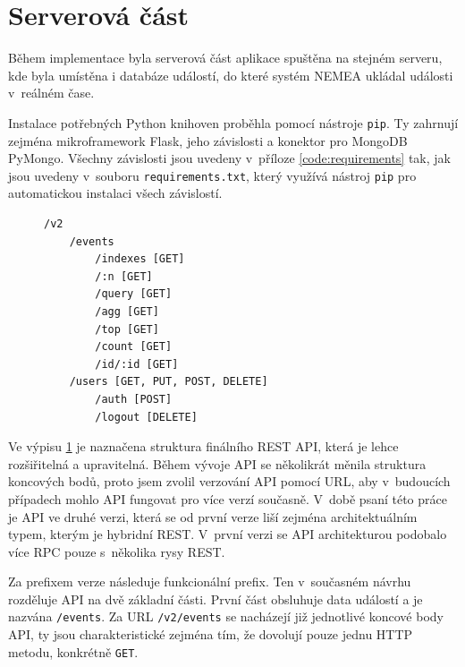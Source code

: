 \section{Serverová část}

Během implementace byla serverová část aplikace spuštěna na stejném serveru, kde byla umístěna i databáze událostí, do které systém NEMEA ukládal události v~reálném čase.

Instalace potřebných Python knihoven proběhla pomocí nástroje \texttt{pip}. Ty zahrnují zejména mikroframework Flask, jeho závislosti a konektor pro MongoDB PyMongo. Všechny závislosti jsou uvedeny v~příloze \ref{code:requirements} tak, jak jsou uvedeny v~souboru \texttt{requirements.txt}, který využívá nástroj \texttt{pip} pro automatickou instalaci všech závislostí.

\begin{figure}[ht]
\lstset{basicstyle=\small,style=JSON}
\begin{lstlisting}
/v2
    /events
        /indexes [GET]
        /:n [GET]
        /query [GET]
        /agg [GET]
        /top [GET]
        /count [GET]
        /id/:id [GET]
    /users [GET, PUT, POST, DELETE]
        /auth [POST]
        /logout [DELETE]
\end{lstlisting}
\label{code:api}
\end{figure}

Ve výpisu \ref{code:api} je naznačena struktura finálního REST API, která je lehce rozšiřitelná a upravitelná. Během vývoje API se několikrát měnila struktura koncových bodů, proto jsem zvolil verzování API pomocí URL, aby v~budoucích případech mohlo API fungovat pro více verzí současně. V~době psaní této práce je API ve druhé verzi, která se od první verze liší zejména architektuálním typem, kterým je hybridní REST. V~první verzi se API architekturou podobalo více RPC pouze s~několika rysy REST.

Za prefixem verze následuje funkcionální prefix. Ten v~současném návrhu rozděluje API na dvě základní části. První část obsluhuje data událostí a je nazvána \texttt{/events}. Za URL \texttt{/v2/events} se nacházejí již jednotlivé koncové body API, ty jsou charakteristické zejména tím, že dovolují pouze jednu HTTP metodu, konkrétně \texttt{GET}.

